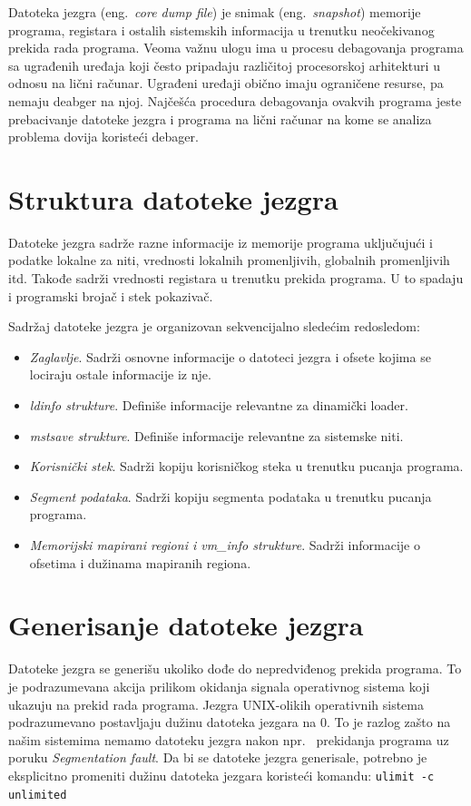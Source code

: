 \documentclass[12pt,oneside]{memoir}
\begin{document}
Datoteka jezgra (eng.~\emph{core dump file}) je snimak (eng.~\emph{snapshot}) memorije programa, registara i ostalih sistemskih informacija u trenutku neočekivanog prekida rada programa. Veoma važnu ulogu ima u procesu debagovanja programa sa ugrađenih uređaja koji često pripadaju različitoj procesorskoj arhitekturi u odnosu na lični računar. Ugrađeni uređaji obično imaju ograničene resurse, pa nemaju deabger na njoj. Najčešća procedura debagovanja ovakvih programa jeste prebacivanje datoteke jezgra i programa na lični računar na kome se analiza problema dovija koristeći debager.

\section{Struktura datoteke jezgra}

Datoteke jezgra sadrže razne informacije iz memorije programa uključujući i podatke lokalne za niti, vrednosti lokalnih promenljivih, globalnih promenljivih itd. Takođe sadrži vrednosti registara u trenutku prekida programa. U to spadaju i programski brojač i stek pokazivač.

Sadržaj datoteke jezgra je organizovan sekvencijalno sledećim redosledom:

\begin{itemize}
	\item \emph{Zaglavlje}. Sadrži osnovne informacije o datoteci jezgra i ofsete kojima se lociraju ostale informacije iz nje.
	\item \emph{ldinfo strukture}. Definiše informacije relevantne za dinamički loader.
	\item \emph{mstsave strukture}. Definiše informacije relevantne za sistemske niti.
	\item \emph{Korisnički stek}. Sadrži kopiju korisničkog steka u trenutku pucanja programa.
	\item \emph{Segment podataka}. Sadrži kopiju segmenta podataka u trenutku pucanja programa.
	\item \emph{Memorijski mapirani regioni i vm\_info strukture}. Sadrži informacije o ofsetima i dužinama mapiranih regiona.
\end{itemize}

\section{Generisanje datoteke jezgra}

Datoteke jezgra se generišu ukoliko dođe do nepredviđenog prekida programa. To je podrazumevana akcija prilikom okidanja signala operativnog sistema koji ukazuju na prekid rada programa. Jezgra UNIX-olikih operativnih sistema podrazumevano postavljaju dužinu datoteka jezgara na 0. To je razlog zašto na našim sistemima nemamo datoteku jezgra nakon npr.~ prekidanja programa uz poruku \emph{Segmentation fault}. Da bi se datoteke jezgra generisale, potrebno je eksplicitno promeniti dužinu datoteka jezgara koristeći komandu:
\newline
\texttt{ulimit -c unlimited}
\end{document}
